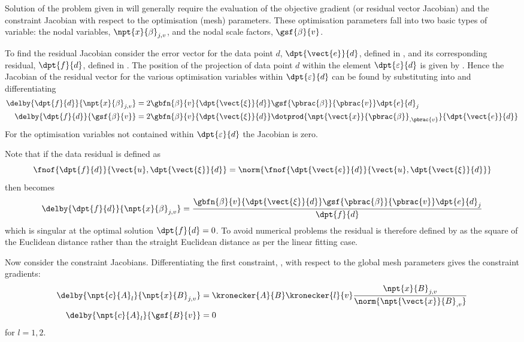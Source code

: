 Solution of the \nonlin problem given in  will
generally require the evaluation of the objective gradient (or residual vector
Jacobian) and the constraint Jacobian with respect to the optimisation (mesh)
parameters. These optimisation parameters fall into two basic types of
variable: the nodal variables, $\npt{x}{\beta}_{j,v}$, and the nodal scale
factors, $\gsf{\beta}{v}$.

To find the residual Jacobian consider the error vector for the data point
$d$, $\dpt{\vect{e}}{d}$, defined in , and its
corresponding residual, $\dpt{f}{d}$, defined in . The
position of the projection of data point $d$ within the element
$\dpt{\varepsilon}{d}$ is given by . Hence the
Jacobian of the residual vector for the various optimisation variables within
$\dpt{\varepsilon}{d}$ can be found by substituting
 into
 and differentiating \ie
\begin{align}
  \delby{\dpt{f}{d}}{\npt{x}{\beta}_{j,v}}&=2\gbfn{\beta}{v}{
    \dpt{\vect{\xi}}{d}}\gsf{\pbrac{\beta}}{\pbrac{v}}\dpt{e}{d}_{j} 
  \label{eqn:dataresjacnodevars} \\
  \delby{\dpt{f}{d}}{\gsf{\beta}{v}}&=2\gbfn{\beta}{v}{\dpt{\vect{\xi}}{d}}
  \dotprod{\npt{\vect{x}}{\pbrac{\beta}}_{,\pbrac{v}}}{\dpt{\vect{e}}{d}}
  \label{eqn:dataresjacsfvars}
\end{align}
For the optimisation variables not contained within $\dpt{\varepsilon}{d}$ the
Jacobian is zero.
  
Note that if the data residual is defined as
\begin{equation}
  \fnof{\dpt{f}{d}}{\vect{u},\dpt{\vect{\xi}}{d}}=\norm{
    \fnof{\dpt{\vect{e}}{d}}{\vect{u},\dpt{\vect{\xi}}{d}}}
\end{equation}
then  becomes
\begin{equation}
  \delby{\dpt{f}{d}}{\npt{x}{\beta}_{j,v}}=\dfrac{\gbfn{\beta}{v}{
      \dpt{\vect{\xi}}{d}}\gsf{\pbrac{\beta}}{\pbrac{v}}
    \dpt{e}{d}_{j}}{\dpt{f}{d}}
\end{equation}
which is singular at the optimal solution $\dpt{f}{d}=0$. To avoid numerical
problems the residual is therefore defined by  as the
square of the Euclidean distance rather than the straight Euclidean distance
as per the linear fitting case.

Now consider the constraint Jacobians. Differentiating the first constraint,
, with respect to the global mesh parameters gives
the constraint gradients:
\begin{align}
  \delby{\npt{c}{A}_{l}}{\npt{x}{B}_{j,v}}&=\kronecker{A}{B}
  \kronecker{l}{v}\dfrac{\npt{x}{B}_{j,v}}{\norm{
      \npt{\vect{x}}{B}_{,v}}} \label{eqn:normjacderiv} \\ 
  \delby{\npt{c}{A}_{l}}{\gsf{B}{v}}&=0 \label{eqn:normjacline}
\end{align}
for $l=1,2$.

